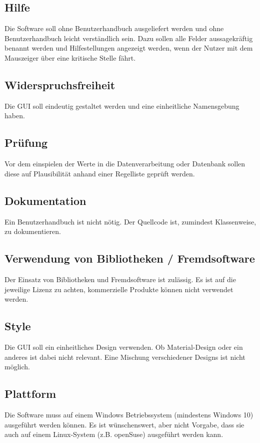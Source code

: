 \documentclass[a4paper]{scrartcl}
\begin{document}
	\subsection{Hilfe}
	Die Software soll ohne Benutzerhandbuch ausgeliefert werden und ohne Benutzerhandbuch leicht verständlich sein. Dazu sollen alle Felder aussagekräftig benannt werden und Hilfestellungen angezeigt werden, wenn der Nutzer mit dem Mauszeiger über eine kritische Stelle fährt.
	
	\subsection{Widerspruchsfreiheit}
	Die GUI soll eindeutig gestaltet werden und eine einheitliche Namensgebung haben.

	\subsection{Prüfung}
	Vor dem einspielen der Werte in die Datenverarbeitung oder Datenbank sollen diese auf Plausibilität anhand einer Regelliste geprüft werden.
	
	\subsection{Dokumentation}
	Ein Benutzerhandbuch ist nicht nötig. Der Quellcode ist, zumindest Klassenweise, zu dokumentieren.
	
	\subsection{Verwendung von Bibliotheken / Fremdsoftware}
	Der Einsatz von Bibliotheken und Fremdsoftware ist zulässig. Es ist auf die jeweilige Lizenz zu achten, kommerzielle Produkte können nicht verwendet werden.
	
	\subsection{Style}
	Die GUI soll ein einheitliches Design verwenden. Ob Material-Design oder ein anderes ist dabei nicht relevant. Eine Mischung verschiedener Designs ist nicht möglich.
	
	\subsection{Plattform}
	Die Software muss auf einem Windows Betriebssystem (mindestens Windows 10) ausgeführt werden können. Es ist wünschenswert, aber nicht Vorgabe, dass sie auch auf einem Linux-System (z.B. openSuse) ausgeführt werden kann.
\end{document}
